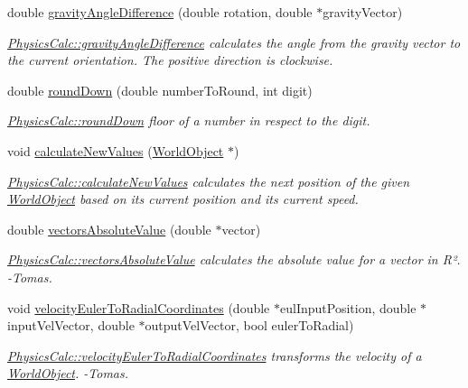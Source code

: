 \begin{DoxyCompactItemize}
\item 
double \hyperlink{class_physics_calc_a515dcab8395108cb37b7526adbab6ed0}{gravity\+Angle\+Difference} (double rotation, double $\ast$gravity\+Vector)
\begin{DoxyCompactList}\small\item\em \hyperlink{class_physics_calc_a515dcab8395108cb37b7526adbab6ed0}{Physics\+Calc\+::gravity\+Angle\+Difference} calculates the angle from the gravity vector to the current orientation. The positive direction is clockwise. \end{DoxyCompactList}\item 
double \hyperlink{class_physics_calc_a7e24e0769598a509705a71a0c4e8ab5d}{round\+Down} (double number\+To\+Round, int digit)
\begin{DoxyCompactList}\small\item\em \hyperlink{class_physics_calc_a7e24e0769598a509705a71a0c4e8ab5d}{Physics\+Calc\+::round\+Down} floor of a number in respect to the digit. \end{DoxyCompactList}\item 
void \hyperlink{class_physics_calc_a8d6de304c47a3b6be6fdfd7bacd3dcd2}{calculate\+New\+Values} (\hyperlink{class_world_object}{World\+Object} $\ast$)
\begin{DoxyCompactList}\small\item\em \hyperlink{class_physics_calc_a8d6de304c47a3b6be6fdfd7bacd3dcd2}{Physics\+Calc\+::calculate\+New\+Values} calculates the next position of the given \hyperlink{class_world_object}{World\+Object} based on it\textquotesingle{}s current position and its current speed. \end{DoxyCompactList}\item 
double \hyperlink{class_physics_calc_a5915904f1743c3a6cca6cf2b72a8d6f5}{vectors\+Absolute\+Value} (double $\ast$vector)
\begin{DoxyCompactList}\small\item\em \hyperlink{class_physics_calc_a5915904f1743c3a6cca6cf2b72a8d6f5}{Physics\+Calc\+::vectors\+Absolute\+Value} calculates the absolute value for a vector in R². -\/\+Tomas. \end{DoxyCompactList}\item 
void \hyperlink{class_physics_calc_aae5264bd415c1cccac4bd4628cb015a0}{velocity\+Euler\+To\+Radial\+Coordinates} (double $\ast$eul\+Input\+Position, double $\ast$input\+Vel\+Vector, double $\ast$output\+Vel\+Vector, bool euler\+To\+Radial)
\begin{DoxyCompactList}\small\item\em \hyperlink{class_physics_calc_aae5264bd415c1cccac4bd4628cb015a0}{Physics\+Calc\+::velocity\+Euler\+To\+Radial\+Coordinates} transforms the velocity of a \hyperlink{class_world_object}{World\+Object}. -\/\+Tomas. \end{DoxyCompactList}\item 

\end{DoxyCompactItemize}
